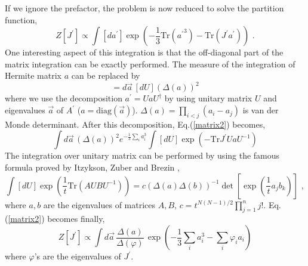 \documentclass[a4paper,aps,preprint,nofootinbib,eqsecnum]{revtex4}
\begin{document}
If we ignore the prefactor, the problem is now reduced to solve the
partition function,
\begin{equation}  \label{matrix2}
Z[J^{\prime}]\propto\int [d{a}^{\prime}] \exp\left( -\frac{1}{3}\mbox{Tr}({{a%
}^{\prime}}^3) - \mbox{Tr}( J^{\prime}{a}^{\prime}) \right)\,\,.
\end{equation}
One interesting aspect of this integration is that the off-diagonal part of
the matrix integration can be exactly performed. The measure of the
integration of Hermite matrix ${a}$ can be replaced by
\begin{equation}
[d{a}^{\prime}]=d\vec{a}\, [dU](\Delta(a))^2
\end{equation}
where we use the decomposition ${a}^{\prime}=Ua U^\dagger$ by using unitary
matrix $U$ and eigenvalues $\vec{a}$ of $A^{\prime}$ ($a=\mbox{diag}(\vec{a}%
) $). $\Delta(a)=\prod_{i<j}(a_i-a_j)$ is van der Monde determinant. After
this decomposition, Eq.(\ref{matrix2}) becomes,
\begin{equation}
\int d\vec{a}\, (\Delta(a))^2 e^{-\frac{1}{3}\sum_i a_i^3}\int[dU] \exp(-%
\mbox{Tr}J^{\prime}UaU^{-1})
\end{equation}
The integration over unitary matrix can be performed by using the famous
formula proved by Itzykson, Zuber and Brezin \cite{Mehta},
\begin{equation}
\int [dU] \exp\left(\frac{1}{t} \mbox{Tr}(AUBU^{-1})\right) = c
(\Delta(a)\Delta(b))^{-1} \det\left[ \exp(\frac{1}{t}a_jb_k) \right]\,\,,
\end{equation}
where $a,b$ are the eigenvalues of matrices $A,B$, $c=t^{N(N-1)/2}%
\prod_{j=1}^n j!$. Eq.(\ref{matrix2}) becomes finally,
\begin{equation}
Z[J^{\prime}]\propto \int d\vec{a}\, \frac{\Delta(a)}{\Delta{(\varphi)}} \,
\exp\left( -\frac{1}{3}\sum_{i} a_i^3 -\sum_{i} \varphi_i a_i \right)
\end{equation}
where $\varphi$'s are the eigenvalues of $J^{\prime}$.

\end{document}
